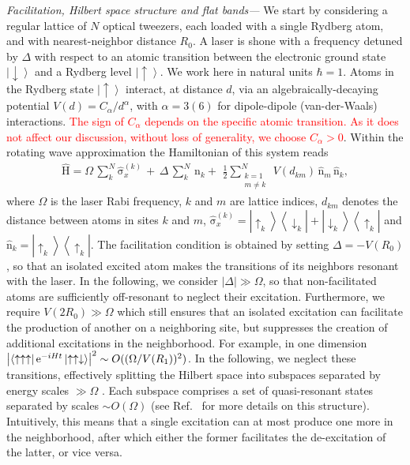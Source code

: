 \documentclass[prl,aps,twocolumn,showpacs,superscriptaddress,longbibliography]{revtex4-1}
\newcommand{\rme}[1]{{\rm{e}}^{#1}}
\newcommand{\lan}{\left\langle}
\newcommand{\ran}{\right\rangle}
\newcommand{\abs}[1]{\left| #1 \right|}
\newcommand{\ket}[1]{\left| #1 \ran}
\newcommand{\bra}[1]{\lan #1 \right|}
\newcommand{\proj}[1]{\ket{#1} \bra{#1}}
\newcommand{\changer}[1]{\textcolor{red}{#1}}
\newcommand{\up}{\uparrow}
\newcommand{\down}{\downarrow}
\newcommand{\op}[1]{\mathrm{\hat{#1}}}
\begin{document}
\emph{Facilitation, Hilbert space structure and flat bands---} We start by considering a regular \cite{footnote1} lattice of $N$ optical tweezers, each loaded with a single Rydberg atom, and with nearest-neighbor distance $R_0$. A laser is shone with a frequency detuned by $\Delta$ with respect to an atomic transition between the electronic ground state $\ket{\down}$ and a Rydberg level $\ket{\up}$. We work here in natural units $\hbar = 1$. Atoms in the Rydberg state $\ket{\up}$ interact, at distance $d$, via an algebraically-decaying potential $V(d) = C_\alpha / d^\alpha$, with $\alpha = 3 (6)$ for dipole-dipole (van-der-Waals) interactions. \changer{The sign of $C_\alpha$ depends on the specific atomic transition. As it does not affect our discussion, without loss of generality, we choose $C_\alpha > 0$}. Within the rotating wave approximation the Hamiltonian of this system reads
%
\begin{align}
 \op{H} = \Omega \, \sum_k^N  \op{\sigma}_x^{(k)} \, + \, \Delta\, \sum_k^N\,\op{n}_k +\,  \,
\frac{1}{2} \sum_{\substack{k= 1\\ m \ne k}}^N \, V(d_{km}) \, \op{n}_m\, \op{n}_k,
 \label{Eq:Hamil_full}
\end{align}
%
where $\Omega$ is the laser Rabi frequency, $k$ and $m$ are lattice indices, $d_{km}$ denotes the distance between atoms in sites $k$ and $m$, $\op{\sigma}_x^{(k)} = \ket{\up_k} \bra{\down_k} + \ket{\down_k} \bra{\up_k}$ and $\op{n}_k = \proj{\up_k}$. The facilitation condition is obtained by setting $\Delta = -V(R_0)$, so that an isolated excited atom makes the transitions of its neighbors resonant with the laser. In the following, we consider $\abs{\Delta} \gg \Omega$, so that non-facilitated atoms are sufficiently off-resonant to neglect their excitation. Furthermore, we require $V(2R_0) \gg \Omega$ which still ensures that an isolated excitation can facilitate the production of another on a neighboring site, but suppresses the creation of additional excitations in the neighborhood. For example, in one dimension $\abs{\bra{\up \up \up} \rme{-iHt} \ket{\up \up \down}}^2 \sim O((\Omega / V(R_1))^2)$. In the following, we neglect these transitions, effectively splitting the Hilbert space into subspaces separated by energy scales $\gg \Omega$ . Each subspace comprises a set of quasi-resonant states separated by scales $\sim O(\Omega)$ (see Ref.~\cite{a_Marcuzzi_PRL_17} for more details on this structure). Intuitively, this means that a single excitation can at most produce one more in the neighborhood, after which either the former facilitates the de-excitation of the latter, or vice versa.
\end{document}
